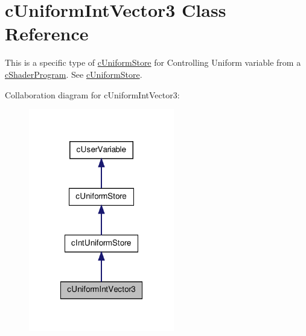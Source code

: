 \hypertarget{classc_uniform_int_vector3}{
\section{cUniformIntVector3 Class Reference}
\label{classc_uniform_int_vector3}
}


This is a specific type of \hyperlink{classc_uniform_store}{cUniformStore} for Controlling Uniform variable from a \hyperlink{classc_shader_program}{cShaderProgram}. See \hyperlink{classc_uniform_store}{cUniformStore}.  




Collaboration diagram for cUniformIntVector3:\nopagebreak
\begin{figure}[H]
\begin{center}
\leavevmode
\includegraphics[width=180pt]{classc_uniform_int_vector3__coll__graph}
\end{center}
\end{figure}
